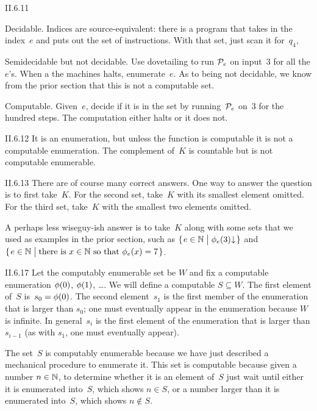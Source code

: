 %
\begin{ans}{II.6.11}
\begin{exparts}
\item Decidable.
Indices are source-equivalent: there is a program that takes in the index~$e$
and puts out the set of instructions.
With that set, just scan it for~$q_4$,
\item Semidecidable but not decidable.
Use dovetailing to
run $\mathcal{P}_e$ on input~$3$ for all the $e$'s.
When a the machines halts, enumerate~$e$.
As to being not decidable, we know from the prior section that this is not
a computable set.
\item Computable.
Given~$e$, decide if it is in the set by running~$\mathcal{P}_e$ on~$3$ for the
hundred steps.
The computation either halts or it does not.
\end{exparts}
\end{ans}
%
\begin{ans}{II.6.12}
It is an enumeration, but unless the function is computable it is not
a computable enumeration.
The complement of~$K$ is countable but is not computable enumerable.
\end{ans}
%
\begin{ans}{II.6.13}
There are of course many correct answers.
One way to answer the question is to first take~$K$.
For the second set, take~$K$ with its smallest element omitted.
For the third set, take~$K$ with the smallest two elements omitted.

A perhaps less wiseguy-ish answer is to take~$K$ along with some sets
that we used as examples in the prior section, such as
$\set{e\in\N\suchthat \TMfcn_e(3)\converges}$
and $\set{e\in\N\suchthat \text{there is $x\in\N$ so that $\TMfcn_e(x)=7$}}$.
\end{ans}
%
%
%
%
\begin{ans}{II.6.17}
Let the computably enumerable set be $W$
and fix a computable enumeration $\phi(0)$, $\phi(1)$, \ldots\@.
We will define a computable $S\subseteq W$.
The first element of~$S$ is~$s_0=\phi(0)$.
The second element~$s_1$ is the first member of the enumeration that
is larger than $s_0$; one must eventually appear in the enumeration
because $W$ is infinite.
In general~$s_i$ is the first element of the enumeration that is larger
than $s_{i-1}$ (as with $s_1$, one must eventually appear).

The set~$S$ is computably enumerable because we have just described a
mechanical procedure to enumerate it.
This set is computable because given a number $n\in\mathbb{N}$, to determine
whether it is an element of~$S$ just wait until either it is enumerated
into~$S$, which shows $n\in S$,
or a number larger than it is enumerated into~$S$, which shows
$n\notin S$.
\end{ans}
